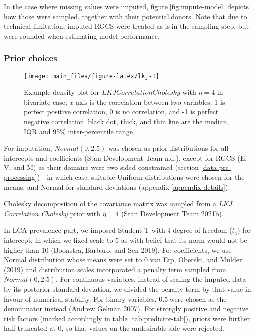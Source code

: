 \documentclass[
]{article}
\begin{document}
In the case where missing values were imputed, figure \ref{fig:impute-model} depicts how those were sampled, together with their potential donors. Note that due to technical limitation, imputed RGCS were treated as-is in the sampling step, but were rounded when estimating model performance.

\hypertarget{prior-choices}{%
\subsubsection{Prior choices}\label{prior-choices}}

\begin{figure}

{\centering \texttt{[image: main\_files/figure-latex/lkj-1]} 

}

\caption{Example density plot for $LKJCorrelationCholesky$ with $\eta=4$ in bivariate case; $x$ axis is the correlation between two variables: 1 is perfect positive correlation, 0 is no correlation, and -1 is perfect negative correlation; black dot, thick, and thin line are the median, IQR and 95\% inter-percentile range}\label{fig:lkj}
\end{figure}

For imputation, \(Normal(0,2.5)\) was chosen as prior distributions for all intercepts and coefficients (Stan Development Team n.d.), except for RGCS (E, V, and M) as their domains were two-sided constrained (section \ref{data-pre-processing}) - in which case, suitable Uniform distributions were chosen for the means, and Normal for standard deviations (appendix \ref{appendix-details}).

Cholesky decomposition of the covariance matrix was sampled from a \emph{LKJ Correlation Cholesky} prior with \(\eta = 4\) (Stan Development Team 2021b).

In LCA prevalence part, we imposed Student T with 4 degree of freedom (\(t_4\)) for intercept, in which we fixed scale to 5 as with belief that its norm would not be higher than 10 (Boonstra, Barbaro, and Sen 2019). For coefficients, we use Normal distribution whose means were set to 0 van Erp, Oberski, and Mulder (2019) and distribution scales incorporated a penalty term sampled from \(Normal(0, 2.5)\). For continuous variables, instead of scaling the imputed data by its posterior standard deviation, we divided the penalty term by that value in favour of numerical stability. For binary variables, 0.5 were chosen as the denominator instead (Andrew Gelman 2007). For strongly positive and negative risk factors (marked accordingly in table \ref{tab:predictor-tab}), priors were further half-truncated at 0, so that values on the undesirable side were rejected.
\end{document}
